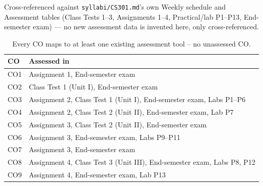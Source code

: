 \documentclass[11pt]{article}
\begin{document}
Cross-referenced against \texttt{syllabi/CS301.md}'s own Weekly schedule and Assessment tables (Class Tests 1--3, Assignments 1--4, Practical/lab P1--P13, End-semester exam) --- no new assessment data is invented here, only cross-referenced.

\begin{table}[h]
\centering
\small
\begin{tabular}{@{}l l@{}}
\toprule
CO & Assessed in \\
\midrule
CO1 & Assignment 1, End-semester exam \\
CO2 & Class Test 1 (Unit I), End-semester exam \\
CO3 & Assignment 2, Class Test 1 (Unit I), End-semester exam, Labs P1--P6 \\
CO4 & Assignment 2, Class Test 2 (Unit II), End-semester exam, Lab P7 \\
CO5 & Assignment 3, Class Test 2 (Unit II), End-semester exam \\
CO6 & Assignment 3, End-semester exam, Labs P9--P11 \\
CO7 & Assignment 3, End-semester exam \\
CO8 & Assignment 4, Class Test 3 (Unit III), End-semester exam, Labs P8, P12 \\
CO9 & Assignment 4, End-semester exam, Lab P13 \\
\bottomrule
\end{tabular}
\caption{Every CO maps to at least one existing assessment tool -- no unassessed CO.}
\label{tab:assessed-in}
\end{table}
\end{document}

